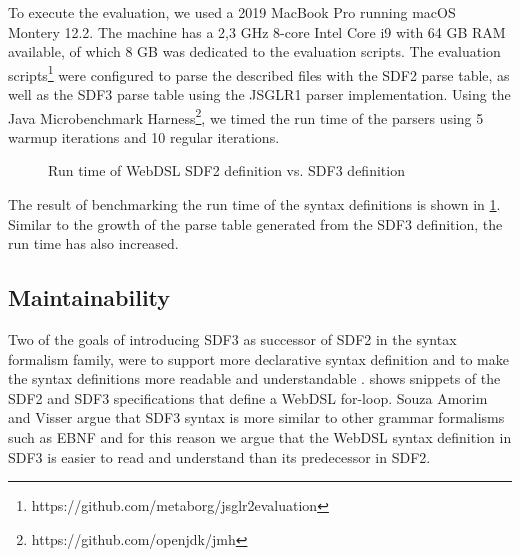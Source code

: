     To execute the evaluation, we used a 2019 MacBook Pro running macOS Montery 12.2. The machine has a 2,3 GHz 8-core Intel Core i9 with 64 GB RAM available, of which 8 GB was dedicated to the evaluation scripts. The evaluation scripts\footnote{https://github.com/metaborg/jsglr2evaluation} were configured to parse the described files with the SDF2 parse table, as well as the SDF3 parse table using the JSGLR1 parser implementation. Using the Java Microbenchmark Harness\footnote{https://github.com/openjdk/jmh}, we timed the run time of the parsers using 5 warmup iterations and 10 regular iterations.

    \begin{figure}
      \parsingbenchmarkresults
      \caption{\label{fig:syntax-performance-charts}Run time of WebDSL SDF2 definition vs. SDF3 definition}
    \end{figure}

    The result of benchmarking the run time of the syntax definitions is shown in \cref{fig:syntax-performance-charts}. Similar to the growth of the parse table generated from the SDF3 definition, the run time has also increased.

  \subsection{Maintainability}

    Two of the goals of introducing SDF3 as successor of SDF2 in the syntax formalism family, were to support more declarative syntax definition and to make the syntax definitions more readable and understandable \autocite{AmorimV20}.  shows snippets of the SDF2 and SDF3 specifications that define a WebDSL for-loop. Souza Amorim and Visser argue that SDF3 syntax is more similar to other grammar formalisms such as EBNF \autocite{BackusBGK0NPRSV63} and for this reason we argue that the WebDSL syntax definition in SDF3 is easier to read and understand than its predecessor in SDF2.

